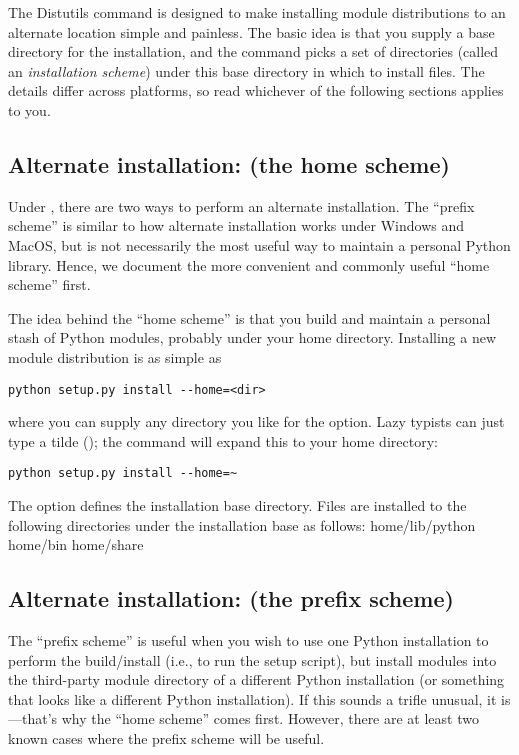 \documentclass{howto}
\begin{document}
The Distutils  command is designed to make installing
module distributions to an alternate location simple and painless.  The
basic idea is that you supply a base directory for the installation, and
the  command picks a set of directories (called an
\emph{installation scheme}) under this base directory in which to
install files.  The details differ across platforms, so read whichever
of the following sections applies to you.


\subsection{Alternate installation: \UNIX{} (the home scheme)}
\label{alt-install-prefix}

Under \UNIX, there are two ways to perform an alternate installation.
The ``prefix scheme'' is similar to how alternate installation works
under Windows and MacOS, but is not necessarily the most useful way to
maintain a personal Python library.  Hence, we document the more
convenient and commonly useful ``home scheme'' first.

The idea behind the ``home scheme'' is that you build and maintain a
personal stash of Python modules, probably under your home directory.
Installing a new module distribution is as simple as
\begin{verbatim}
python setup.py install --home=<dir>
\end{verbatim}
where you can supply any directory you like for the 
option.  Lazy typists can just type a tilde (\code{\textasciitilde}); the
 command will expand this to your home directory:
\begin{verbatim}
python setup.py install --home=~
\end{verbatim}

The  option defines the installation base
directory.  Files are installed to the following directories under the
installation base as follows:
              {home}{/lib/python}
              {home}{/bin}
              {home}{/share}

\subsection{Alternate installation: \UNIX{} (the prefix scheme)}
\label{alt-install-home}

The ``prefix scheme'' is useful when you wish to use one Python
installation to perform the build/install (i.e., to run the setup
script), but install modules into the third-party module directory of a
different Python installation (or something that looks like a different
Python installation).  If this sounds a trifle unusual, it is---that's
why the ``home scheme'' comes first.  However, there are at least two
known cases where the prefix scheme will be useful.
\end{document}
